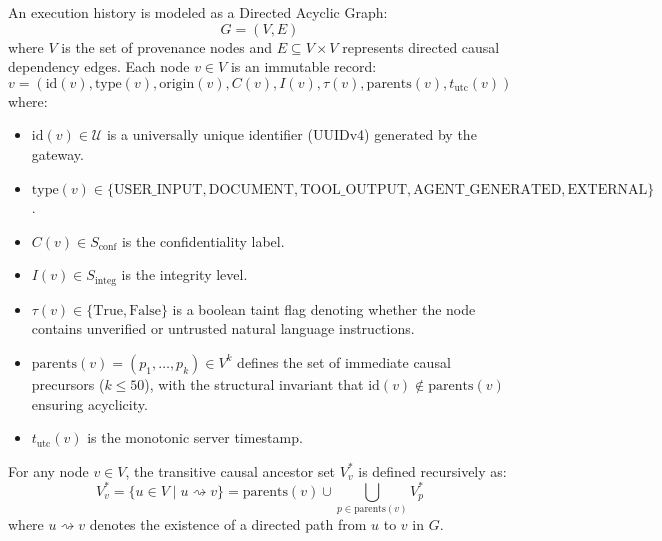 \begin{definition}
An execution history is modeled as a Directed Acyclic Graph:
\begin{equation}
G = (V, E)
\end{equation}
where $V$ is the set of provenance nodes and $E \subseteq V \times V$ represents directed causal dependency edges. Each node $v \in V$ is an immutable record:
\begin{equation}
v = (\text{id}(v), \text{type}(v), \text{origin}(v), C(v), I(v), \tau(v), \text{parents}(v), t_{\text{utc}}(v))
\end{equation}
where:
\begin{itemize}
    \item $\text{id}(v) \in \mathcal{U}$ is a universally unique identifier (UUIDv4) generated by the gateway.
    \item $\text{type}(v) \in \{\text{USER\_INPUT}, \text{DOCUMENT}, \text{TOOL\_OUTPUT}, \text{AGENT\_GENERATED}, \text{EXTERNAL}\}$.
    \item $C(v) \in S_{\text{conf}}$ is the confidentiality label.
    \item $I(v) \in S_{\text{integ}}$ is the integrity level.
    \item $\tau(v) \in \{\text{True}, \text{False}\}$ is a boolean taint flag denoting whether the node contains unverified or untrusted natural language instructions.
    \item $\text{parents}(v) = (p_1, \dots, p_k) \in V^k$ defines the set of immediate causal precursors ($k \le 50$), with the structural invariant that $\text{id}(v) \notin \text{parents}(v)$ ensuring acyclicity.
    \item $t_{\text{utc}}(v)$ is the monotonic server timestamp.
\end{itemize}
\end{definition}

\begin{definition}
For any node $v \in V$, the transitive causal ancestor set $V_v^*$ is defined recursively as:
\begin{equation}
V_v^* = \{u \in V \mid u \rightsquigarrow v\} = \text{parents}(v) \cup \bigcup_{p \in \text{parents}(v)} V_p^*
\end{equation}
where $u \rightsquigarrow v$ denotes the existence of a directed path from $u$ to $v$ in $G$.
\end{definition}

